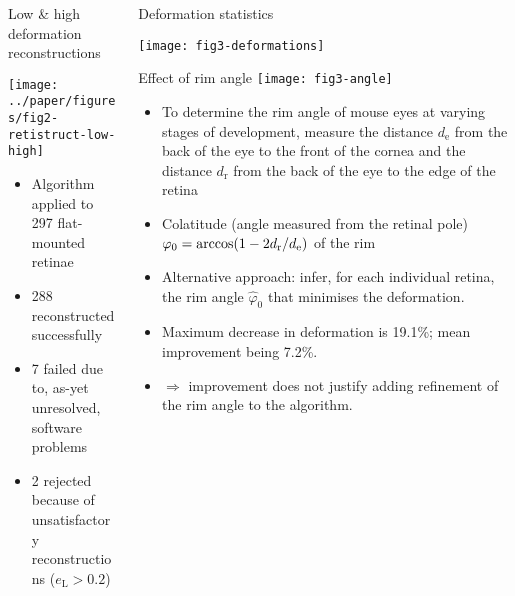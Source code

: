 \documentclass[final]{beamer}
\begin{document}
\begin{frame}{}
\begin{columns}[T]
\begin{column}{.37\linewidth}
      \begin{block}{Low \& high deformation reconstructions}

        \texttt{[image: ../paper/figures/fig2-retistruct-low-high]}     
        \begin{itemize}
        \item  Algorithm applied to 297 flat-mounted retinae
        \item 288  reconstructed successfully
        \item 7 failed due to, as-yet unresolved, software problems
        \item 2 rejected because of unsatisfactory reconstructions ($e_\mathrm{L}>0.2$)
        \end{itemize}
      \end{block}

    \end{column}

    \begin{column}{.25\linewidth}


      \begin{block}{Deformation statistics}

        \texttt{[image: fig3-deformations]}     
      \end{block}

      \begin{block}{Effect of rim angle}
        \texttt{[image: fig3-angle]}     
        \begin{itemize}
        \item To determine the rim angle of mouse eyes at varying
          stages of development, measure the distance $d_\mathrm{e}$
          from the back of the eye to the front of the cornea and the
          distance $d_\mathrm{r}$ from the back of the eye to the edge
          of the retina
        \item Colatitude (angle measured from the retinal pole)
          $\varphi _0=\arccos (1-2d_{\text r}/d_{\text e})$ of the rim
        \item Alternative approach: infer, for each individual retina,
          the rim angle $\hat\varphi _0$ that minimises the deformation.
        \item Maximum decrease in deformation is 19.1\%; mean
          improvement being 7.2\%.
        \item $\Rightarrow$ improvement does not justify adding
          refinement of the rim angle to the algorithm.
        \end{itemize}
      \end{block}


\end{column}
\end{columns}
\end{frame}
\end{document}
